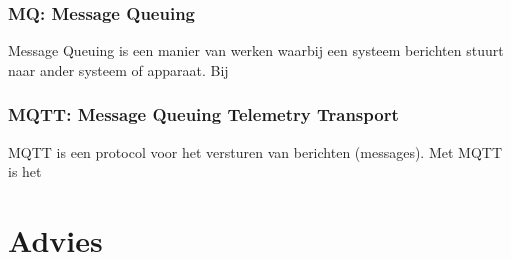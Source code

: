 \subsubsection{MQ: Message Queuing}
Message Queuing is een manier van werken waarbij een systeem berichten stuurt
naar ander systeem of apparaat. Bij 

\subsubsection{MQTT: Message Queuing Telemetry Transport}
MQTT is een protocol voor het versturen van berichten (messages).
Met MQTT is het 


\section{Advies}



